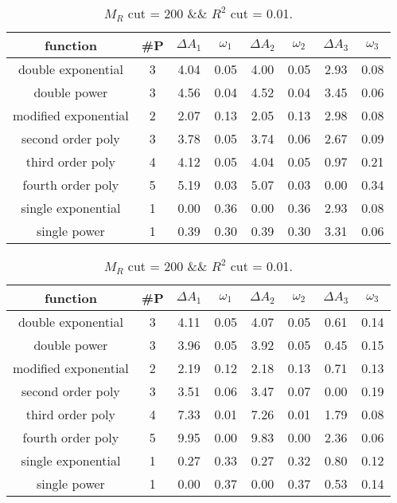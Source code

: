  
\begin{table}[H] 
\begin{center} 
\begin{tabular}{|c|c|cc|cc|cc|} 
\hline function & \#P & $\Delta A_1$ & $\omega_1$ & $\Delta A_2$ & $\omega_2$ & $\Delta A_3$ & $\omega_3$ \\ \hline 
double exponential &  3 &   4.04 &   0.05 &   4.00 &   0.05 &   2.93 &   0.08 \\ 
double power &  3 &   4.56 &   0.04 &   4.52 &   0.04 &   3.45 &   0.06 \\ 
modified exponential &  2 &   2.07 &   0.13 &   2.05 &   0.13 &   2.98 &   0.08 \\ 
second order poly &  3 &   3.78 &   0.05 &   3.74 &   0.06 &   2.67 &   0.09 \\ 
third order poly &  4 &   4.12 &   0.05 &   4.04 &   0.05 &   0.97 &   0.21 \\ 
fourth order poly &  5 &   5.19 &   0.03 &   5.07 &   0.03 &   0.00 &   0.34 \\ 
single exponential &  1 &   0.00 &   0.36 &   0.00 &   0.36 &   2.93 &   0.08 \\ 
single power &  1 &   0.39 &   0.30 &   0.39 &   0.30 &   3.31 &   0.06 \\ 
\hline 
\end{tabular} 
\caption{$M_R$ cut = 200 \&\& $R^2$ cut = 0.01.} 
\label{tab:FitChoices_200_0.01} 
\end{center} 
\end{table} 
 
 
\begin{table}[H] 
\begin{center} 
\begin{tabular}{|c|c|cc|cc|cc|} 
\hline function & \#P & $\Delta A_1$ & $\omega_1$ & $\Delta A_2$ & $\omega_2$ & $\Delta A_3$ & $\omega_3$ \\ \hline 
double exponential &  3 &   4.11 &   0.05 &   4.07 &   0.05 &   0.61 &   0.14 \\ 
double power &  3 &   3.96 &   0.05 &   3.92 &   0.05 &   0.45 &   0.15 \\ 
modified exponential &  2 &   2.19 &   0.12 &   2.18 &   0.13 &   0.71 &   0.13 \\ 
second order poly &  3 &   3.51 &   0.06 &   3.47 &   0.07 &   0.00 &   0.19 \\ 
third order poly &  4 &   7.33 &   0.01 &   7.26 &   0.01 &   1.79 &   0.08 \\ 
fourth order poly &  5 &   9.95 &   0.00 &   9.83 &   0.00 &   2.36 &   0.06 \\ 
single exponential &  1 &   0.27 &   0.33 &   0.27 &   0.32 &   0.80 &   0.12 \\ 
single power &  1 &   0.00 &   0.37 &   0.00 &   0.37 &   0.53 &   0.14 \\ 
\hline 
\end{tabular} 
\caption{$M_R$ cut = 200 \&\& $R^2$ cut = 0.01.} 
\label{tab:FitChoices_200_0.01} 
\end{center} 
\end{table} 
 
